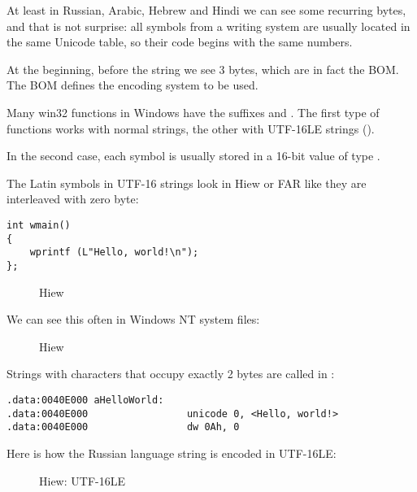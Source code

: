 At least in Russian, Arabic, Hebrew and Hindi we can see some recurring bytes, and that is not surprise:
all symbols from a writing system are usually located in the same Unicode table, so their code begins with
the same numbers.

At the beginning, before the  string we see 3 bytes, which are in fact the \ac{BOM}.
The \ac{BOM} defines the encoding system to be
used.


Many win32 functions in Windows have the suffixes  and .
The first type of functions works
with normal strings, the other with UTF-16LE strings ().

In the second case, each symbol is usually stored in a 16-bit value of type .

The Latin symbols in UTF-16 strings look in Hiew or FAR like they are interleaved with zero byte:

\begin{lstlisting}
int wmain()
{
	wprintf (L"Hello, world!\n");
};
\end{lstlisting}

\begin{figure}[H]
\centering
{}
\caption{Hiew}
\end{figure}

We can see this often in \gls{Windows NT} system files:

\begin{figure}[H]
\centering
{}
\caption{Hiew}
\end{figure}

Strings with characters that occupy exactly 2 bytes are called  in \IDA:

\begin{lstlisting}
.data:0040E000 aHelloWorld:
.data:0040E000                 unicode 0, <Hello, world!>
.data:0040E000                 dw 0Ah, 0
\end{lstlisting}

Here is how the Russian language string is encoded in UTF-16LE:

\begin{figure}[H]
\centering
{}
\caption{Hiew: UTF-16LE}
\end{figure}

